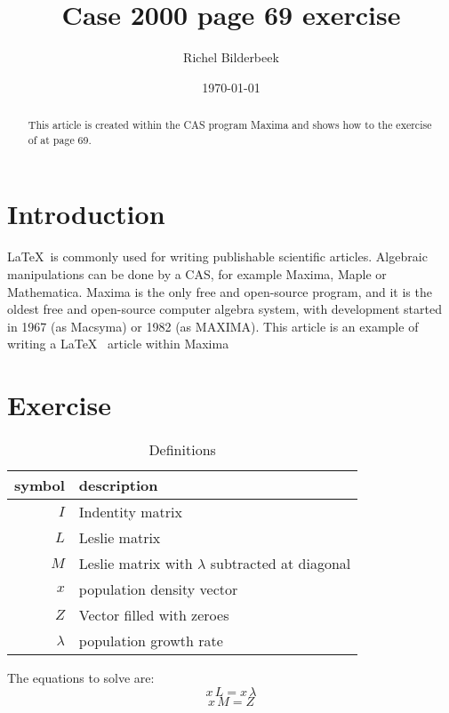 \documentclass{article}
\title{Case 2000 page 69 exercise}
\author{Richel Bilderbeek}
\date{\today}
\begin{document}
\maketitle

\begin{abstract}
This article is created within the CAS program Maxima
and shows how to the exercise of \cite{case2000} at page 69.
\end{abstract}

\section{Introduction}

\LaTeX~is commonly used for writing publishable scientific articles\cite{gaudeul2006}.
Algebraic manipulations can be done by a CAS, for example Maxima, Maple or Mathematica.
Maxima is the only free and open-source program, and it is the oldest free and open-source computer algebra system, with development started in 1967 (as Macsyma) or 1982 (as MAXIMA).
This article is an example of writing a \LaTeX~ article within Maxima

\section{Exercise}

\begin{table}[here]
  \centering
  \begin{tabular}{ | r | l | }
    \hline
    symbol & description \\
    \hline
    $I$ & Indentity matrix \\
    $L$ & Leslie matrix \\
    $M$ & Leslie matrix with $\lambda$ subtracted at diagonal \\
    $x$ & population density vector \\
    $Z$ & Vector filled with zeroes \\
    $\lambda$ & population growth rate \\
    \hline
  \end{tabular}
  \caption{Definitions}
  \label{table:table_definition}
\end{table}

The equations to solve are:
\begin{equation}
x\,L=x\,\lambda\label{eq:eq3_21}
\end{equation}
\begin{equation}
x\,M=Z\label{eq:eq3_23}
\end{equation}
\end{document}
